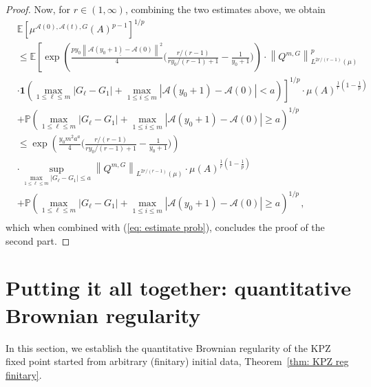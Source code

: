 \documentclass[11pt, reqno]{amsart}
\numberwithin{equation}{section}
\newcommand{\norm}[1]{\left\lVert#1\right\rVert}
\begin{document}
\begin{proof}
    Now, for $r\in (1,\infty)$, combining the two estimates above, we obtain
\begin{align*}
     &\mathbb{E}\left[\mu^{\mathcal{A}(0), \mathcal{A}(t), G}(A)^{p-1}\right]^{1/p} \\
    &\le \mathbb{E}\left[\exp\left({\frac{py_0\norm{\underline{\mathcal{A}(y_0+1)-\mathcal{A}(0)}}^2}{4}\big(\frac{r/(r-1)}{ry_0/(r-1)+1}-\frac{1}{y_0+1}\big)}\right)\cdot \norm{Q^{m, G}}^{p}_{L^{2r/(r-1)}(\mu)}\right.\\
    & \left.\cdot \mathbf{1}\left(\displaystyle \max_{1\le \ell \le m}|G_\ell - G_1| + \max_{1\le i \le m}|\mathcal{A}(y_0+1)-\mathcal{A}(0)|<a\right)\right]^{1/p}\cdot\mu(A)^{\frac{1}{r}(1-\frac{1}{p})}\\
    & + \mathbb{P}\left(\displaystyle \max_{1\le \ell \le m}|G_\ell - G_1| + \max_{1\le i \le m}|\mathcal{A}(y_0+1)-\mathcal{A}(0)|\ge a\right)^{1/p}\\
    &\le \exp\left({\frac{y_0m^2 a^a}{4}\big(\frac{r/(r-1)}{ry_0/(r-1)+1}-\frac{1}{y_0+1}\big)}\right)\\
    &\cdot \displaystyle\sup_{\max_{1\le \ell \le m}|G_\ell - G_1| \le a}\norm{Q^{m, G}}_{L^{2r/(r-1)}(\mu)} \cdot \mu(A)^{\frac{1}{r}(1-\frac{1}{p})}\\
     & + \mathbb{P}\left(\displaystyle \max_{1\le \ell \le m}|G_\ell - G_1| + \max_{1\le i \le m}|\mathcal{A}(y_0+1)-\mathcal{A}(0)|\ge a\right)^{1/p}\,,\\
\end{align*}
    which when combined with (\ref{eq: estimate prob}), concludes the proof of the second part.
\end{proof}

\section{Putting it all together: quantitative Brownian regularity}\label{sec: brownian regularity combined}

In this section, we establish the quantitative Brownian regularity of the KPZ fixed point started from arbitrary (finitary) initial data, Theorem~\ref{thm: KPZ reg finitary}.
 
\end{document}
